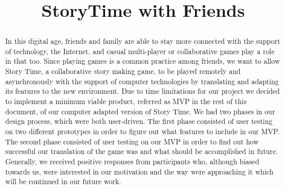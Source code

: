 \documentclass{sigchi}
\begin{document}
\title{StoryTime with Friends}

\author{%
}

\maketitle


\raggedbottom{}


\begin{abstract}
In this digital age, friends and family are able to stay more connected with the support of technology, the Internet, and casual multi-player or collaborative games play a role in that too. Since playing games is a common practice among friends, we want to allow Story Time, a collaborative story making game, to be played remotely and asynchronously with the support of computer technologies by translating and adapting its features to the new environment. Due to time limitations for our project we decided to implement a minimum viable product, referred as MVP in the rest of this document, of our computer adapted version of Story Time. We had two phases in our design process, which were both user-driven. The first phase consisted of user testing on two different prototypes in order to figure out what features to include in our MVP. The second phase consisted of user testing on our MVP in order to find out how successful our translation of the game was and what should be accomplished in future. Generally, we received positive responses from participants who, although biased towards us, were interested in our motivation and the way were approaching it which will be continued in our future work. 
\end{abstract}
\end{document}
